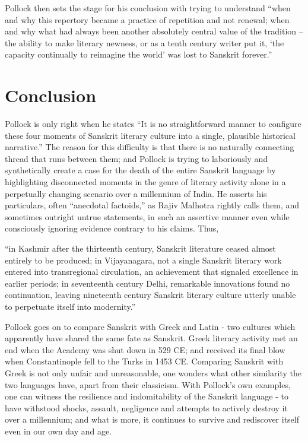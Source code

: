 Pollock then sets the stage for his conclusion with trying to understand “when and why this repertory became a practice of repetition and not renewal; when and why what had always been another absolutely central value of the tradition – the ability to make literary newness, or as a tenth century writer put it, ‘the capacity continually to reimagine the world’ was lost to Sanskrit forever.”

\section*{Conclusion}

Pollock is only right when he states “It is no straightforward manner to configure these four moments of Sanskrit literary culture into a single, plausible historical narrative.” The reason for this difficulty is that there is no naturally connecting thread that runs between them; and Pollock is trying to laboriously and synthetically create a case for the death of the entire Sanskrit language by highlighting disconnected moments in the genre of literary activity alone in a perpetually changing scenario over a millennium of India.  He asserts his particulars, often “anecdotal factoids,” as Rajiv Malhotra rightly calls them, and sometimes outright untrue statements, in such an assertive manner even while consciously ignoring evidence contrary to his claims. Thus, 

\begin{myquote}
“in Kashmir after the thirteenth century, Sanskrit literature ceased almost entirely to be produced; in Vijayanagara, not a single Sanskrit literary work entered into transregional circulation, an achievement that signaled excellence in earlier periods; in seventeenth century Delhi, remarkable innovations found no continuation, leaving nineteenth century Sanskrit literary culture utterly unable to perpetuate itself into modernity.” 
\end{myquote}

Pollock goes on to compare Sanskrit with Greek and Latin - two cultures which apparently have shared the same fate as Sanskrit.  Greek literary activity met an end when the Academy was shut down in 529 CE; and received its final blow when Constantinople fell to the Turks in 1453 CE\@. Comparing Sanskrit with Greek is not only unfair and unreasonable, one wonders what other similarity the two languages have, apart from their classicism. With Pollock’s own examples, one can witness the resilience and indomitability of the Sanskrit language - to have withstood shocks, assault, negligence and attempts to actively destroy it over a millennium; and what is more, it continues to survive and rediscover itself even in our own day and age.

